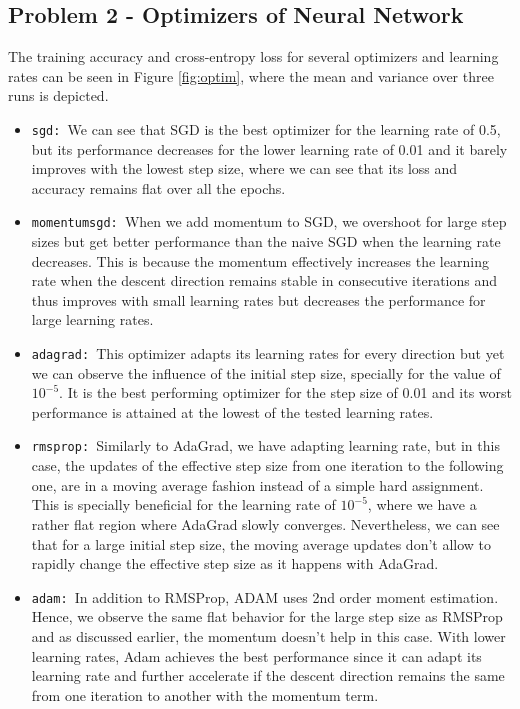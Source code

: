 \documentclass[letterpaper]{article}
\providecommand{\1}{\mathbf{1}}
\providecommand{\0}{\mathbf{0}}
\begin{document}
\subsection*{Problem 2 - Optimizers of Neural Network}

The training accuracy and cross-entropy loss for several optimizers and learning rates can be seen in Figure \ref{fig:optim}, where the mean and variance over three runs is depicted.

\begin{itemize}
    \item \texttt{sgd: }We can see that SGD is the best optimizer for the learning rate of 0.5, but its performance decreases for the lower learning rate of 0.01 and it barely improves with the lowest step size, where we can see that its loss and accuracy remains flat over all the epochs.

    \item \texttt{momentumsgd: }When we add momentum to SGD, we overshoot for large step sizes but get better performance than the naive SGD when the learning rate decreases. This is because the momentum effectively increases the learning rate when the descent direction remains stable in consecutive iterations and thus improves with small learning rates but decreases the performance for large learning rates.
    
    \item \texttt{adagrad: }This optimizer adapts its learning rates for every direction but yet we can observe the influence of the initial step size, specially for the value of $10^{-5}$. It is the best performing optimizer for the step size of 0.01 and its worst performance is attained at the lowest of the tested learning rates.
    
    \item \texttt{rmsprop: }Similarly to AdaGrad, we have adapting learning rate, but in this case, the updates of the effective step size from one iteration to the following one, are in a moving average fashion instead of a simple hard assignment. This is specially beneficial for the learning rate of $10^{-5}$, where we have a rather flat region where AdaGrad slowly converges. Nevertheless, we can see that for a large initial step size, the moving average updates don't allow to rapidly change the effective step size as it happens with AdaGrad.
    
    \item \texttt{adam: }In addition to RMSProp, ADAM uses 2nd order moment estimation. Hence, we observe the same flat behavior for the large step size as RMSProp and as discussed earlier, the momentum doesn't help in this case. With lower learning rates, Adam achieves the best performance since it can adapt its learning rate and further accelerate if the descent direction remains the same from one iteration to another with the momentum term.
\end{itemize}
\end{document}

